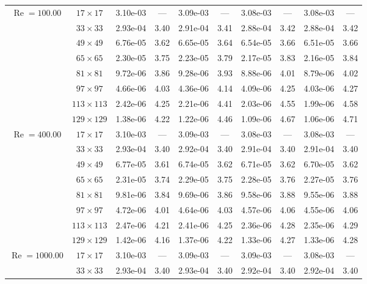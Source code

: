 \documentclass[preprint, 12pt]{elsarticle}
\begin{document}
\begin{center}
\begin{table}[H]
{\begin{tabular*}{\textwidth}{@{\extracolsep\fill}cccccccccc@{}}
    \hline
    \multirow{7}{*}{$\operatorname{Re}=100.00$} & $17\times 17$ & 3.10e-03 & --- & 3.09e-03 & --- & 3.08e-03 & --- & 3.08e-03 & --- \\
& $33\times 33$ & 2.93e-04 & 3.40 & 2.91e-04 & 3.41 & 2.88e-04 & 3.42 & 2.88e-04 & 3.42 \\
& $49\times 49$ & 6.76e-05 & 3.62 & 6.65e-05 & 3.64 & 6.54e-05 & 3.66 & 6.51e-05 & 3.66 \\
\multirow{3}{*}{$\operatorname{Wi}=5$} & $65\times 65$ & 2.30e-05 & 3.75 & 2.23e-05 & 3.79 & 2.17e-05 & 3.83 & 2.16e-05 & 3.84 \\
& $81\times 81$ & 9.72e-06 & 3.86 & 9.28e-06 & 3.93 & 8.88e-06 & 4.01 & 8.79e-06 & 4.02 \\
& $97\times 97$ & 4.66e-06 & 4.03 & 4.36e-06 & 4.14 & 4.09e-06 & 4.25 & 4.03e-06 & 4.27 \\
& $113\times 113$ & 2.42e-06 & 4.25 & 2.21e-06 & 4.41 & 2.03e-06 & 4.55 & 1.99e-06 & 4.58 \\
& $129\times 129$ & 1.38e-06 & 4.22 & 1.22e-06 & 4.46 & 1.09e-06 & 4.67 & 1.06e-06 & 4.71 \\
    \hline
    \multirow{7}{*}{$\operatorname{Re}=400.00$} & $17\times 17$ & 3.10e-03 & --- & 3.09e-03 & --- & 3.08e-03 & --- & 3.08e-03 & --- \\
& $33\times 33$ & 2.93e-04 & 3.40 & 2.92e-04 & 3.40 & 2.91e-04 & 3.40 & 2.91e-04 & 3.40 \\
& $49\times 49$ & 6.77e-05 & 3.61 & 6.74e-05 & 3.62 & 6.71e-05 & 3.62 & 6.70e-05 & 3.62 \\
\multirow{3}{*}{$\operatorname{Wi}=5$} & $65\times 65$ & 2.31e-05 & 3.74 & 2.29e-05 & 3.75 & 2.28e-05 & 3.76 & 2.27e-05 & 3.76 \\
& $81\times 81$ & 9.81e-06 & 3.84 & 9.69e-06 & 3.86 & 9.58e-06 & 3.88 & 9.55e-06 & 3.88 \\
& $97\times 97$ & 4.72e-06 & 4.01 & 4.64e-06 & 4.03 & 4.57e-06 & 4.06 & 4.55e-06 & 4.06 \\
& $113\times 113$ & 2.47e-06 & 4.21 & 2.41e-06 & 4.25 & 2.36e-06 & 4.28 & 2.35e-06 & 4.29 \\
& $129\times 129$ & 1.42e-06 & 4.16 & 1.37e-06 & 4.22 & 1.33e-06 & 4.27 & 1.33e-06 & 4.28 \\
    \hline
    \multirow{7}{*}{$\operatorname{Re}=1000.00$} & $17\times 17$ & 3.10e-03 & --- & 3.09e-03 & --- & 3.09e-03 & --- & 3.08e-03 & --- \\
& $33\times 33$ & 2.93e-04 & 3.40 & 2.93e-04 & 3.40 & 2.92e-04 & 3.40 & 2.92e-04 & 3.40 \\

\end{tabular*}}
\end{table}
\end{center}
\end{document}
